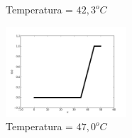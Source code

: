 \documentclass{report}
\begin{document}
\begin{enumerate}
\begin{figure}[h!]
\begin{center}
    \end{center}
    \caption{Temperatura = $42,3^oC$}
\end{figure}

\begin{figure}[h!]
\begin{center}
    \includegraphics[width=0.4\textwidth]{graph27.png}
    \end{center}
\caption{Temperatura = $47,0^oC$}
\end{figure}



\end{enumerate}

\cleardoublepage

%
\end{document}
